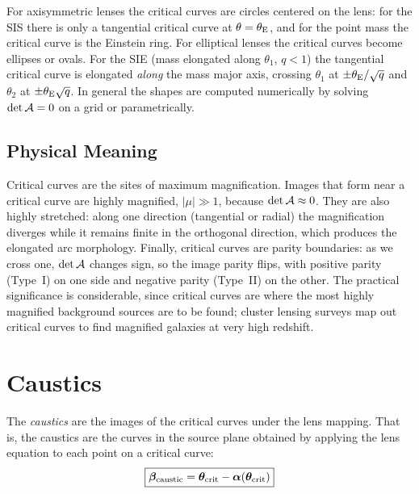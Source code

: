 For axisymmetric lenses the critical curves are circles centered on
the lens: for the SIS there is only a tangential critical curve at
$\theta = \theta_{\mathrm{E}}$, and for the point mass the critical curve is the
Einstein ring.  For elliptical lenses the critical curves become
ellipses or ovals.  For the SIE (mass elongated along $\theta_1$,
$q < 1$) the tangential critical curve is elongated \emph{along} the
mass major axis, crossing $\theta_1$ at $\pm\theta_{\mathrm{E}}/\sqrt{q}$ and
$\theta_2$ at $\pm\theta_{\mathrm{E}}\sqrt{q}$.  In general the shapes are
computed numerically by solving $\det\mathcal{A} = 0$ on a grid or
parametrically.

\subsection{Physical Meaning}

Critical curves are the sites of maximum magnification.  Images that
form near a critical curve are highly magnified, $|\mu| \gg 1$,
because $\det\mathcal{A} \approx 0$.  They are also highly stretched: along
one direction (tangential or radial) the magnification diverges while
it remains finite in the orthogonal direction, which produces the
elongated arc morphology.  Finally, critical curves are parity
boundaries: as we cross one, $\det\mathcal{A}$ changes sign, so the image
parity flips, with positive parity (Type~I) on one side and negative
parity (Type~II) on the other.  The practical significance is
considerable, since critical curves are where the most highly
magnified background sources are to be found; cluster lensing surveys
map out critical curves to find magnified galaxies at very high
redshift.


\section{Caustics}
\label{sec:caustics}

\begin{definition}
The \emph{caustics} are the images of the critical curves under the
lens mapping.  That is, the caustics are the curves in the
source plane obtained by applying the lens equation to each
point on a critical curve:
\begin{equation}
    \boxed{
    \boldsymbol{\beta}_{\mathrm{caustic}}
    = \boldsymbol{\theta}_{\mathrm{crit}}
    - \boldsymbol{\alpha}(\boldsymbol{\theta}_{\mathrm{crit}})
    }
    \label{eq:caustic_def_mod8}
\end{equation}
\end{definition}


